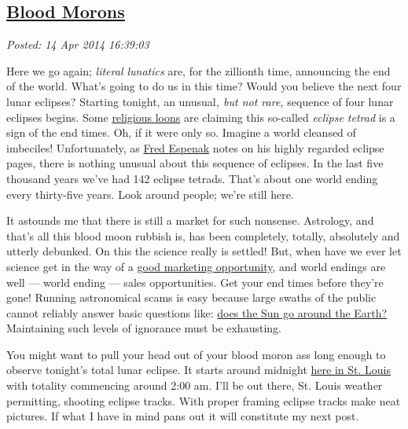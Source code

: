 %

\subsection*{\href{http://bakerjd99.wordpress.com/2014/04/14/blood-morons/}{Blood Morons}}


\noindent\emph{Posted: 14 Apr 2014 16:39:03}
\vspace{6pt}

Here we go again; \emph{literal lunatics} are, for the zillionth time,
announcing the end of the world. What's going to do us in this time?
Would you believe the next four lunar eclipses? Starting tonight, an
unusual\emph{, but not rare,} sequence of four lunar eclipses begins.
Some
\href{http://www.nydailynews.com/news/national/televangelist-claims-blood-moons-sign-world-shaking-event-article-1.1754601}{religious
loons} are claiming this so-called \emph{eclipse tetrad} is a sign of
the end times. Oh, if it were only so. Imagine a world cleansed of
imbeciles! Unfortunately, as
\href{http://eclipse.gsfc.nasa.gov/OH/OH2014.html\#tetrads}{Fred
Espenak} notes on his highly regarded eclipse pages, there is nothing
unusual about this sequence of eclipses. In the last five thousand
years we've had 142 eclipse tetrads. That's about one world ending
every thirty-five years. Look around people; we're still here.

It astounds me that there is still a market for such nonsense.
Astrology, and that's all this blood moon rubbish is, has been
completely, totally, absolutely and utterly debunked. On this the
science really is settled! But, when have we ever let science get in the
way of a \href{http://fourbloodmoons.net/}{good marketing opportunity},
and world endings are well --- world ending --- sales opportunities.
Get your end times before they're gone! Running astronomical scams is
easy because large swaths of the public cannot reliably answer basic
questions like:
\href{http://www.npr.org/blogs/thetwo-way/2014/02/14/277058739/1-in-4-americans-think-the-sun-goes-around-the-earth-survey-says}{does
the Sun go around the Earth?} Maintaining such levels of ignorance must
be exhausting.

You might want to pull your head out of your blood moron ass long enough
to observe tonight's total lunar eclipse. It starts around midnight
\href{http://blog.realtimestl.com/2014/04/when-and-how-to-watch-the-lunar-eclipse-in-st-louis/}{here
in St. Louis} with totality commencing around 2:00 am. I'll be out
there, St. Louis weather permitting, shooting eclipse tracks. With
proper framing eclipse tracks make neat pictures. If what I have in mind
pans out it will constitute my next post.



%